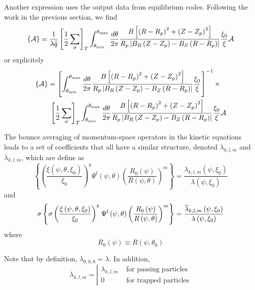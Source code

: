 Another expression uses the output data from equilibrium codes. Following
the work in the previous section, we find 
\begin{equation}
\left\{ \mathcal{A}\right\} =\frac{1}{\lambda \widetilde{q}}\left[ \frac{1}{2%
}\sum_{\sigma }\right] _{T}\int_{\theta _{\min }}^{\theta _{\max }}\frac{%
d\theta }{2\pi }\frac{B\left[ \left( R-R_{p}\right) ^{2}+\left(
Z-Z_{p}\right) ^{2}\right] }{R_{p}\left| B_{R}\left( Z-Z_{p}\right)
-B_{Z}\left( R-R_{p}\right) \right| }\frac{\xi _{0}}{\xi }\mathcal{A}
\end{equation}
or explicitely 
\begin{align}
\left\{ \mathcal{A}\right\} & =\left[ \int_{\theta _{\min }}^{\theta _{\max
}}\frac{d\theta }{2\pi }\frac{B\left[ \left( R-R_{p}\right) ^{2}+\left(
Z-Z_{p}\right) ^{2}\right] }{R_{p}\left| B_{R}\left( Z-Z_{p}\right)
-B_{Z}\left( R-R_{p}\right) \right| }\frac{\xi _{0}}{\xi }\right] ^{-1}\times
\notag \\
& \;\left[ \frac{1}{2}\sum_{\sigma }\right] _{T}\int_{\theta _{\min
}}^{\theta _{\max }}\frac{d\theta }{2\pi }\frac{B\left[ \left(
R-R_{p}\right) ^{2}+\left( Z-Z_{p}\right) ^{2}\right] }{R_{p}\left|
B_{R}\left( Z-Z_{p}\right) -B_{Z}\left( R-R_{p}\right) \right| }\frac{\xi
_{0}}{\xi }\mathcal{A}
\end{align}

The bounce averaging of momentum-space operators in the kinetic equations
leads to a set of coefficients that all have a similar structure, denoted $%
\lambda _{k,l,m}$ and $\overline{\lambda }_{k,l,m}$, which are define as 
\begin{equation}
\left\{ \left( \frac{\xi \left( \psi ,\theta ,\xi _{0}\right) }{\xi _{0}}%
\right) ^{k}\Psi ^{l}\left( \psi ,\theta \right) \left( \frac{R_{0}\left(
\psi \right) }{R\left( \psi ,\theta \right) }\right) ^{m}\right\} =\frac{
\lambda _{k,l,m}\left( \psi ,\xi _{0}\right) }{\lambda \left( \psi ,\xi
_{0}\right) }  \label{lkm}
\end{equation}
and 
\begin{equation}
\sigma \left\{ \sigma \left( \frac{\xi \left( \psi ,\theta ,\xi _{0}\right) 
}{\xi _{0}}\right) ^{k}\Psi ^{l}\left( \psi ,\theta \right) \left( \frac{%
R_{0}\left( \psi \right) }{R\left( \psi ,\theta \right) }\right)
^{m}\right\} =\frac{\overline{\lambda }_{k,l,m}\left( \psi ,\xi _{0}\right) 
}{\lambda \left( \psi ,\xi _{0}\right) }  \label{lkmb}
\end{equation}
 where 
\begin{equation}
R_{0}\left( \psi \right) \equiv R\left( \psi ,\theta _{0}\right)
\end{equation}

Note that by definition, $\lambda _{0,0,0}=\lambda $. In addition, 
\begin{equation}
\overline{\lambda }_{k,l,m}=\left| 
\begin{array}{ll}
\lambda _{k,l,m} & \text{ for passing particles} \\ 
0 & \text{ for trapped particles}%
\end{array}
\right.
\end{equation}
